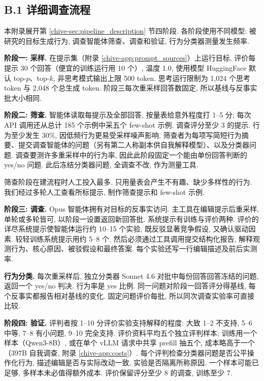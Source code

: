 \subsection*{B.1 详细调查流程}
本附录展开第 \ref{chive-sec:pipeline_description} 节四阶段. 各阶段使用不同模型: 被研究的目标生成行为, 调查智能体筛查、调查和验证, 行为分类器测量发生频率.

\textbf{阶段一: 采样.} 在提示集（附录 \ref{chive-app:prompt_sources}）上运行目标, 评价每提示 30 个回答（便宜的训练运行用 10 个）, 温度 1.0, 使用模型 HuggingFace 默认 top-$p$、top-$k$, 非思考模式输出上限 500 token. 思考运行限制为 1,024 个思考 token 与 2,048 个总生成 token. 阶段三每次重采样回答数固定, 所以基线与反事实批大小相同.

\textbf{阶段二: 筛查.} 智能体读取每提示及全部回答, 按量表给意外程度打 1--5 分; 每次 API 调用还从总计 185 个示例中采五个 few-shot 示例. 调查评分至少 3 的提示. 行为至少发生 30\%, 因低频行为更易受采样噪声影响. 筛查者为每项写简短行为摘要、提交调查智能体的问题（另有第二人称副本供自我解释模型）、以及分类器问题. 调查要测许多重采样中的行为率, 因此此阶段固定一个能由单份回答判断的 yes/no 问题. 此后冻结分类器问题, 全调查不改, 作为测量工具.

筛查阶段在建流程时人工投入最多. 只用量表会产生不有趣、缺少多样性的行为. 我们经过多轮人工查看所标提示, 制作筛查提示和 few-shot 示例.

\textbf{阶段三: 调查.} Opus 智能体拥有对目标的反事实访问. 主工具在编辑提示后重采样, 单轮或多轮皆可, 以阶段一设置返回新回答批. 系统提示有训练与评价两种. 评价的详尽系统提示使智能体运行约 10--15 个实验, 既反驳显著竞争假设, 又确认驱动因素. 较轻训练系统提示用约 5--8 个. 然后必须通过工具调用提交结构化报告, 解释观测行为、核心原因、被驳假设和最终答案. 每个实验还写一行编辑描述及前后实测率.

\textbf{行为分类.} 每次重采样后, 独立分类器 Sonnet 4.6 对批中每份回答回答冻结的问题, 返回一个 yes/no 判决. 行为率是 yes 比例. 同一问题对阶段一回答评分得基线, 每个反事实都报告相对基线的变化. 固定问题评价每批, 所以同次调查实验率可直接比较.

\textbf{阶段四: 验证.} 评判者按 1--10 分评价实验支持解释的程度: 大致 1--2 不支持, 5--6 中等, 7--8 有小问题, 9--10 完全支持. 评价资料平均五个独立评判样本; 训练用一个样本（Qwen3-8B）, 或在单个 vLLM 请求中共享 prefill 抽五个, 成本略高于一个（397B 自我调查, 附录 \ref{chive-app:costs}）. 每个评判检查分类器问题是否公平操作化行为, 描述编辑是否与实际改动一致, 实验是否隔离所称原因. 一个样本可能已足够, 多样本未必值得额外成本. 评价保留评分至少 8 的调查, 训练至少 7.

